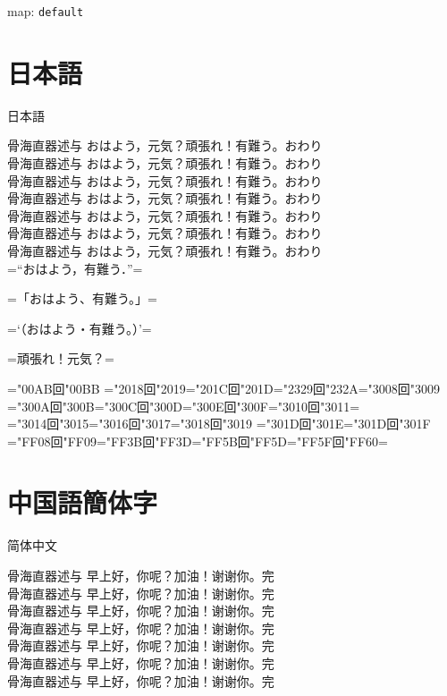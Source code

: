 \documentclass[landscape]{utarticle}
\def\map{default}
\begin{document}
\parindent0mm
map: \texttt{\map}

\section{日本語}
\upjpngtb 日本語

\upjpnrml 骨海直器述与 おはよう，元気？頑張れ！有難う。おわり\\
\upjpnrmm 骨海直器述与 おはよう，元気？頑張れ！有難う。おわり\\
\upjpnrmb 骨海直器述与 おはよう，元気？頑張れ！有難う。おわり\\
\upjpngtm 骨海直器述与 おはよう，元気？頑張れ！有難う。おわり\\
\upjpngtb 骨海直器述与 おはよう，元気？頑張れ！有難う。おわり\\
\upjpngte 骨海直器述与 おはよう，元気？頑張れ！有難う。おわり\\
\upjpngth 骨海直器述与 おはよう，元気？頑張れ！有難う。おわり\\

\upjpnrmm
=“おはよう，有難う．”=

=「おはよう、有難う。」=

=‘（おはよう・有難う。）’=

=頑張れ！元気？=

=\kchar"00AB回\kchar"00BB%
=\kchar"2018回\kchar"2019=\kchar"201C回\kchar"201D=\kchar"2329回\kchar"232A=\kchar"3008回\kchar"3009%
=\kchar"300A回\kchar"300B=\kchar"300C回\kchar"300D=\kchar"300E回\kchar"300F=\kchar"3010回\kchar"3011=\\
=\kchar"3014回\kchar"3015=\kchar"3016回\kchar"3017=\kchar"3018回\kchar"3019%
=\kchar"301D回\kchar"301E=\kchar"301D回\kchar"301F%
=\kchar"FF08回\kchar"FF09=\kchar"FF3B回\kchar"FF3D=\kchar"FF5B回\kchar"FF5D=\kchar"FF5F回\kchar"FF60=


\section{中国語簡体字}
\upschgtb 简体中文

\upschrml 骨海直器述与 早上好，你呢？加油！谢谢你。完\\
\upschrmm 骨海直器述与 早上好，你呢？加油！谢谢你。完\\
\upschrmb 骨海直器述与 早上好，你呢？加油！谢谢你。完\\
\upschgtm 骨海直器述与 早上好，你呢？加油！谢谢你。完\\
\upschgtb 骨海直器述与 早上好，你呢？加油！谢谢你。完\\
\upschgte 骨海直器述与 早上好，你呢？加油！谢谢你。完\\
\upschgth 骨海直器述与 早上好，你呢？加油！谢谢你。完\\
\end{document}
